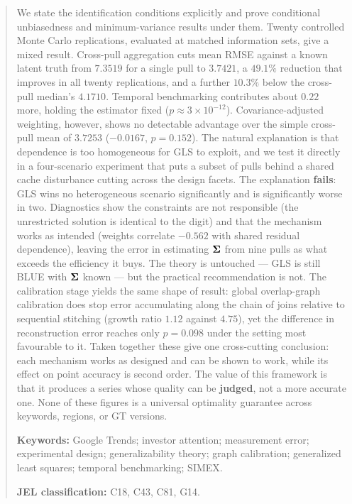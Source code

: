 \documentclass[12pt,a4paper,oneside]{article}
\begin{document}
\begin{abstract}
We state the identification conditions explicitly and prove conditional
unbiasedness and minimum-variance results under them. Twenty controlled Monte
Carlo replications, evaluated at matched information sets, give a mixed result.
Cross-pull aggregation cuts mean RMSE against a known latent truth from $7.3519$
for a single pull to $3.7421$, a $49.1\%$ reduction that improves in all twenty
replications, and a further $10.3\%$ below the cross-pull median's $4.1710$.
Temporal benchmarking contributes about $0.22$ more, holding the estimator fixed
($p\approx3\times10^{-12}$). Covariance-adjusted weighting, however, shows no
detectable advantage over the simple cross-pull mean of $3.7253$ ($-0.0167$,
$p=0.152$). The natural explanation is that dependence is too homogeneous for
GLS to exploit, and we test it directly in a four-scenario experiment that puts
a subset of pulls behind a shared cache disturbance cutting across the design
facets. The explanation \textbf{fails}: GLS wins no heterogeneous scenario
significantly and is significantly worse in two. Diagnostics show the
constraints are not responsible (the unrestricted solution is identical to the
digit) and that the mechanism works as intended (weights correlate $-0.562$ with
shared residual dependence), leaving the error in estimating $\Sig$ from nine
pulls as what exceeds the efficiency it buys. The theory is untouched --- GLS is
still BLUE with $\Sig$ known --- but the practical recommendation is not. The
calibration stage yields the same shape of result: global overlap-graph
calibration does stop error accumulating along the chain of joins relative to
sequential stitching (growth ratio $1.12$ against $4.75$), yet the difference in
reconstruction error reaches only $p=0.098$ under the setting most favourable to
it. Taken together these give one cross-cutting conclusion: each mechanism works
as designed and can be shown to work, while its effect on point accuracy is
second order. The value of this framework is that it produces a series whose
quality can be \textbf{judged}, not a more accurate one. None of these figures is
a universal optimality guarantee across keywords, regions, or GT versions.

\medskip
\noindent\textbf{Keywords:} Google Trends; investor attention; measurement
error; experimental design; generalizability theory; graph calibration;
generalized least squares; temporal benchmarking; SIMEX.

\medskip
\noindent\textbf{JEL classification:} C18, C43, C81, G14.
\end{abstract}
\end{document}
